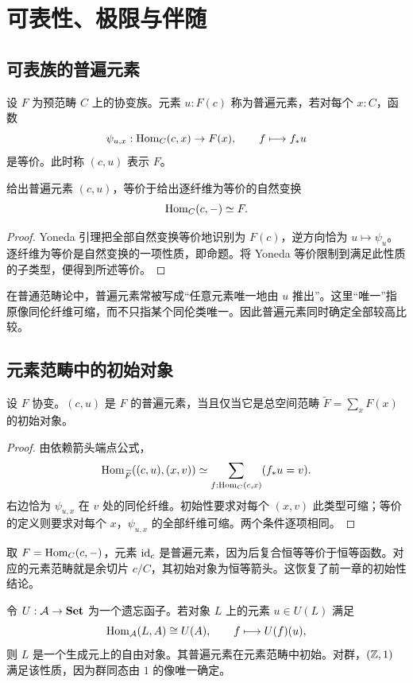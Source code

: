 \chapter{可表性、极限与伴随}
\section{可表族的普遍元素}
\begin{definition}[普遍元素]
设 $F$ 为预范畴 $C$ 上的协变族。元素 $u:F(c)$ 称为普遍元素，若对每个 $x:C$，函数
\[
\psi_{u,x}:\operatorname{Hom}_C(c,x)\to F(x),
\qquad f\longmapsto f_*u
\]
是等价。此时称 $(c,u)$ 表示 $F$。
\end{definition}
\begin{proposition}
给出普遍元素 $(c,u)$，等价于给出逐纤维为等价的自然变换
\[
\operatorname{Hom}_C(c,-)\simeq F.
\]
\end{proposition}
\begin{proof}
Yoneda 引理把全部自然变换等价地识别为 $F(c)$，逆方向恰为 $u\mapsto\psi_u$。逐纤维为等价是自然变换的一项性质，即命题。将 Yoneda 等价限制到满足此性质的子类型，便得到所述等价。
\end{proof}
\begin{remark}
在普通范畴论中，普遍元素常被写成“任意元素唯一地由 $u$ 推出”。这里“唯一”指原像同伦纤维可缩，而不只指某个同伦类唯一。因此普遍元素同时确定全部较高比较。
\end{remark}

\section{元素范畴中的初始对象}
\begin{theorem}[可表性的初始对象判据]\label{thm:universal-element}
设 $F$ 协变。$(c,u)$ 是 $F$ 的普遍元素，当且仅当它是总空间范畴 $\widetilde F=\sum_xF(x)$ 的初始对象。
\end{theorem}
\begin{proof}
由依赖箭头端点公式，
\[
\operatorname{Hom}_{\widetilde F}((c,u),(x,v))
\simeq\sum_{f:\operatorname{Hom}_C(c,x)}(f_*u=v).
\]
右边恰为 $\psi_{u,x}$ 在 $v$ 处的同伦纤维。初始性要求对每个 $(x,v)$ 此类型可缩；等价的定义则要求对每个 $x$，$\psi_{u,x}$ 的全部纤维可缩。两个条件逐项相同。
\end{proof}
\begin{example}
取 $F=\operatorname{Hom}_C(c,-)$，元素 $\operatorname{id}_c$ 是普遍元素，因为后复合恒等等价于恒等函数。对应的元素范畴就是余切片 $c/C$，其初始对象为恒等箭头。这恢复了前一章的初始性结论。
\end{example}
\begin{example}[自由对象的普通情形]
令 $U:\mathcal A\to\mathbf{Set}$ 为一个遗忘函子。若对象 $L$ 上的元素 $u\in U(L)$ 满足
\[
\operatorname{Hom}_{\mathcal A}(L,A)\cong U(A),
\qquad f\longmapsto U(f)(u),
\]
则 $L$ 是一个生成元上的自由对象。其普遍元素在元素范畴中初始。对群，$(\mathbb Z,1)$ 满足该性质，因为群同态由 $1$ 的像唯一确定。
\end{example}

